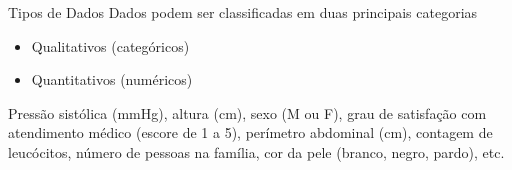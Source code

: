 \documentclass{beamer}
\begin{document}
\begin{frame}{Tipos de Dados}
Dados podem ser classificadas em duas principais categorias
  \begin{itemize}
  \item Qualitativos (categóricos)
  \item Quantitativos (numéricos)
  \end{itemize}
  \begin{example}
    Pressão sistólica (mmHg), altura (cm), sexo (M ou F), grau de
    satisfação com atendimento médico (escore de 1 a 5), perímetro
    abdominal (cm), contagem de leucócitos, número de pessoas na
    família, cor da pele (branco, negro, pardo), etc.
  \end{example}
\end{frame}




\end{document}
